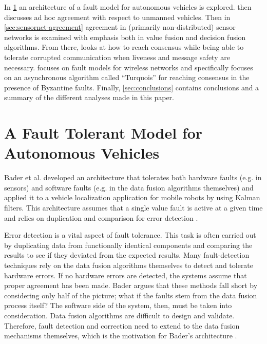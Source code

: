 \documentclass[twoside, conference]{IEEEtran}
\begin{document}
In \cref{sec:ftmodel-autonomous} an architecture of a fault model for autonomous vehicles is explored.   then discusses ad hoc agreement with respect to unmanned vehicles.  Then in \cref{sec:sensornet-agreement} agreement in (primarily non-distributed) sensor networks is examined with emphasis both in value fusion and decision fusion algorithms.  From there,  looks at how to reach consensus while being able to tolerate corrupted communication when liveness and message safety are necessary.   focuses on fault models for wireless networks and specifically focuses on an asynchronous algorithm called ``Turquois'' for reaching consensus in the presence of Byzantine faults.  Finally, \cref{sec:conclusions} contains conclusions and a summary of the different analyses made in this paper.

\section{A Fault Tolerant Model for Autonomous Vehicles}\label{sec:ftmodel-autonomous} %

Bader et al. developed an architecture that tolerates both hardware faults (e.g. in sensors) and software faults (e.g. in the data fusion algorithms themselves) and applied it to a vehicle localization application for mobile robots by using Kalman filters. This architecture assumes that a single value fault is active at a given time and relies on duplication and comparison for error detection \cite{Bader2014}.

Error detection is a vital aspect of fault tolerance. This task is often carried out by duplicating data from functionally identical components and comparing the results to see if they deviated from the expected results. Many fault-detection techniques rely on the data fusion algorithms themselves to detect and tolerate hardware errors. If no hardware errors are detected, the systems assume that proper agreement has been made. Bader argues that these methods fall short by considering only half of the picture; what if the faults stem from the data fusion process itself? The software side of the system, then, must be taken into consideration. Data fusion algorithms are difficult to design and validate. Therefore, fault detection and correction need to extend to the data fusion mechanisms themselves, which is the motivation for Bader's architecture \cite{Bader2014}.
\end{document}
